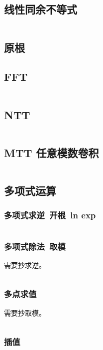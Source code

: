 \documentclass[titlepage, a4paper]{article}
\begin{document}
\begin{multicols}{2}
\begin{spacing}{0.6}
				\subsection{线性同余不等式}
					\inputminted{cpp}{src/Math/线性同余不等式.cpp}
				\subsection{原根}
					
				\subsection{FFT}
					\inputminted{cpp}{src/Math/FFT.cpp}
				\subsection{NTT}
					\inputminted{cpp}{src/Math/NTT.cpp}
				\subsection{MTT 任意模数卷积}
					\inputminted[highlightlines={24,27}]{cpp}{src/Math/MTT.cpp}
				\subsection{多项式运算}
					\subsubsection{多项式求逆\ 开根\ ln exp}
						\inputminted{cpp}{src/Math/多项式运算.cpp}
					\subsubsection{多项式除法\ 取模}
						需要抄求逆。
						\inputminted{cpp}{src/Math/多项式取模.cpp}
					\subsubsection{多点求值}
						需要抄取模。
						\inputminted{cpp}{src/Math/多点求值.cpp}
					\subsubsection{插值}
						

\end{spacing}
\end{multicols}
\end{document}
